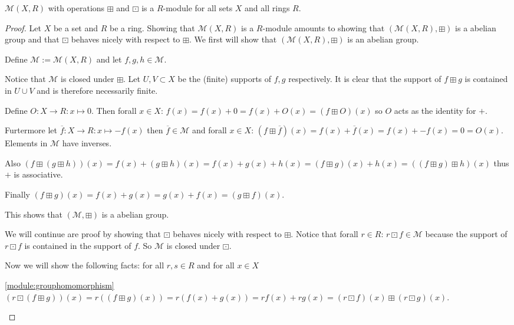 \begin{lemma}
	$\mathcal{M}(X,R)$ with operations $\boxplus$ and $\boxdot$ is a
	$R$-module for all sets $X$ and all rings $R$. 
\end{lemma}

\begin{proof}
	Let $X$ be a set and $R$ be a ring. Showing that $\mathcal{M}(X,R)$ is a
	$R$-module amounts to showing that $(\mathcal{M}(X,R),\boxplus)$ is a
	abelian group and that $\boxdot$ behaves nicely with respect to
	$\boxplus$. We first will show that $(\mathcal{M}(X,R),\boxplus)$ is an
	abelian group.
	
	Define $\mathcal{M} := \mathcal{M}(X,R)$ and let $f,g,h\in\mathcal{M}$.
	
	Notice that $\mathcal{M}$ is closed under $\boxplus$. Let $U,V\subset X$
	be the (finite) supports of $f,g$ respectively. It is clear that the
	support of $f\boxplus g$ is contained in $U\cup V$ and is therefore
	necessarily finite.  
	
	Define $O:X\rightarrow R : x\mapsto 0$. Then forall $x\in X$: $f(x) =
	f(x) + 0 = f(x) + O(x) = (f\boxplus O)(x)$ so $O$ acts as the identity
	for $+$.
	
	Furtermore let $\overline{f}:X\rightarrow R: x\mapsto -f(x)$ then
	$\overline{f}\in \mathcal{M}$ and forall $x\in X$:
	$(f\boxplus\overline{f})(x) = f(x) + \overline{f}(x) = 
	f(x) + -f(x) = 0 = O(x)$. Elements in $\mathcal{M}$ have inverses.
	
	Also $(f\boxplus (g\boxplus h))(x) = f(x) + (g\boxplus h)(x) = f(x) +
	g(x) + h(x) = (f\boxplus g)(x) + h(x) = ((f\boxplus g)\boxplus h)(x)$
	thus $+$ is associative. 
	
	Finally $(f\boxplus g)(x) = f(x) + g(x) = g(x) + f(x) = (g\boxplus f)(x)$.
	
	This shows that $(\mathcal{M},\boxplus)$ is a abelian group.
	
	We will continue are proof by showing that $\boxdot$ behaves nicely with
	respect to $\boxplus$. Notice that forall $r\in R$: $r\boxdot
	f\in\mathcal{M}$ because the support of $r\boxdot f$ is contained in the
	support of $f$. So $\mathcal{M}$ is closed under $\boxdot$.
	
	Now we will show the following facts: for all $r,s\in R$ and for all
	$x\in X$
	\begin{namedlist}[\ref{module:ringhomomorphism3}]
		\item[\ref{module:grouphomomorphism}] $(r\boxdot(f\boxplus g))(x) =
		r((f\boxplus g)(x)) = r(f(x)+g(x)) = rf(x) + rg(x) = (r\boxdot
		f)(x) \boxplus (r\boxdot g)(x)$.
		

\end{namedlist}
\end{proof}
